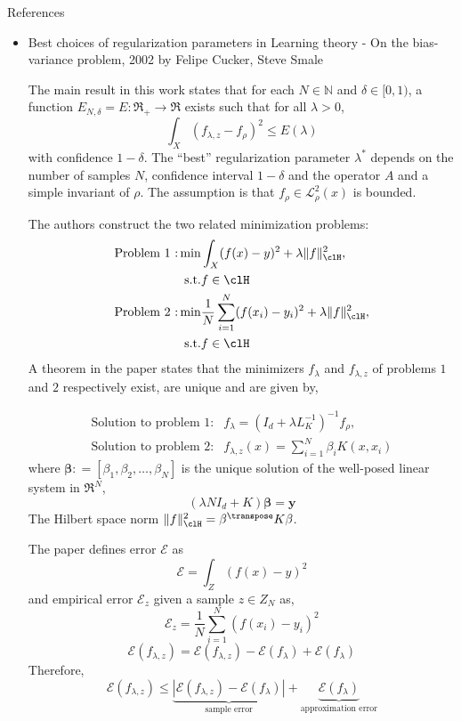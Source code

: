 References
\begin{itemize}
\item Best choices of regularization parameters in Learning theory - On the bias-variance problem, 2002 by Felipe Cucker, Steve Smale


The main result in this work states that for each $N\in \mathbb{N}$ and $\delta \in [0,1)$, a function $E_{N,\delta} = E : \Re_+ \to \Re$ exists such that for all $\lambda >0$,
\[
\int_X (f_{\lambda,z} - f_\rho)^2 \leq E(\lambda)
\]
with confidence $1-\delta$. The ``best'' regularization parameter $\lambda^*$ depends on the number of samples $N$, confidence interval $1-\delta$ and the operator $A$ and a simple invariant of $\rho$. The assumption is that $f_\rho \in \mathcal{L}^2_\rho(x)$ is bounded. 

The authors construct the two related minimization problems: 
\[
\begin{aligned}
\text{Problem 1 :} \min & \int_X(f(x) - y)^2 + \lambda \|f\|^2_\clH, \\
\text{s.t.} & f \in \clH \\
%
\text{Problem 2 :} \min & \frac{1}{N} \sum_{i=1}^N (f(x_i) - y_i)^2 + \lambda \|f\|^2_\clH,\\
\text{s.t.} & f \in \clH
\end{aligned}
\]
A theorem in the paper states that the minimizers $f_\lambda$ and $f_{\lambda,z}$ of problems $1$ and $2$ respectively exist, are unique and are given by, 

\[
\begin{aligned}
\text{Solution to problem 1:} &
f_\lambda = (I_d + \lambda L_K^{-1})^{-1} f_\rho, \\
\text{Solution to problem 2:} & 
f_{\lambda,z}(x) = \sum_{i=1}^N \beta_i K(x,x_i)
\end{aligned}
\]
where $\mathbf{\beta}: = [\beta_1, \beta_2, \hdots, \beta_N]$ is the unique solution of the well-posed linear system in $\Re^N$,
\[
(\lambda N I_d + K) \mathbf{\beta} = \mathbf{y}
\]
The Hilbert space norm $\|f\|^2_\clH = \beta^\transpose K \beta$.

The paper defines error $\mathcal{E}$ as 
\[
\mathcal{E} = \int_Z (f(x) - y)^2
\]
and empirical error $\mathcal{E}_z$ given a sample $z \in Z_N$ as,
\[
\mathcal{E}_z = \frac{1}{N} \sum_{i=1}^N (f(x_i) - y_i)^2
\]
\[
\mathcal{E}(f_{\lambda,z}) = \mathcal{E}(f_{\lambda, z }) - \mathcal{E}(f_\lambda) + \mathcal{E}(f_\lambda)
\]
Therefore, 
\[
\mathcal{E}(f_{\lambda,z}) \leq \underbrace{|\mathcal{E}(f_{\lambda,z}) - \mathcal{E}(f_\lambda)|}_{\text{sample error}} + \underbrace{\mathcal{E}(f_\lambda)}_{\text{approximation error}}
\]


\end{itemize}

